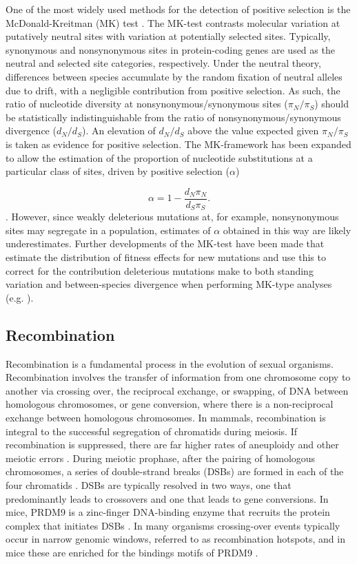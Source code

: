 	One of the most widely used methods for the detection of positive selection is the McDonald-Kreitman (MK) test \citep{RN293}. The MK-test contrasts molecular variation at putatively neutral sites with variation at potentially selected sites. Typically, synonymous and nonsynonymous sites in protein-coding genes are used as the neutral and selected site categories, respectively. Under the neutral theory, differences between species accumulate by the random fixation of neutral  alleles due to drift, with a negligible contribution from positive selection. As such, the ratio of nucleotide diversity at nonsynonymous/synonymous sites ($\pi_N / \pi_S$) should be statistically indistinguishable from the ratio of nonsynonymous/synonymous divergence ($d_N / d_S$). An elevation of $d_N / d_S$ above the value expected given $\pi_N / \pi_S$ is taken as evidence for positive selection. The MK-framework has been expanded to allow the estimation of the proportion of nucleotide substitutions at a particular class of sites, driven by positive selection ($\alpha$)

\begin{equation}
\alpha = 1 - \frac{d_N \pi_N}{d_S \pi_S}.
\end{equation}
\noindent
\citep{RN294}. However, since weakly deleterious mutations at, for example, nonsynonymous sites may segregate in a population, estimates of $\alpha$ obtained in this way are likely underestimates. Further developments of the MK-test have been made that estimate the distribution of fitness effects for new mutations and use this to correct for the contribution deleterious mutations make to both standing variation and between-species divergence when performing MK-type analyses (e.g. \citealt{RN165}).

\subsection{Recombination}

	Recombination is a fundamental process in the evolution of sexual organisms. Recombination involves the transfer of information from one chromosome copy to another via crossing over, the reciprocal exchange, or swapping, of DNA between homologous chromosomes, or gene conversion, where there is a non-reciprocal exchange between homologous chromosomes. In mammals, recombination is integral to the successful segregation of chromatids during meiosis. If recombination is suppressed, there are far higher rates of aneuploidy and other meiotic errors \citep{RN388}. During meiotic prophase, after the pairing of homologous chromosomes, a series of double-strand breaks (DSBs) are formed in each of the four chromatids \citep{RN388}. DSBs are typically resolved in two ways, one that predominantly leads to crossovers and one that leads to gene conversions. In mice, PRDM9 is a zinc-finger DNA-binding enzyme that recruits the protein complex that initiates DSBs \citep{RN388}. In many organisms crossing-over events typically occur in narrow genomic windows, referred to as recombination hotspots, and in mice these are enriched for the bindings motifs of PRDM9 \citep{RN388}.


